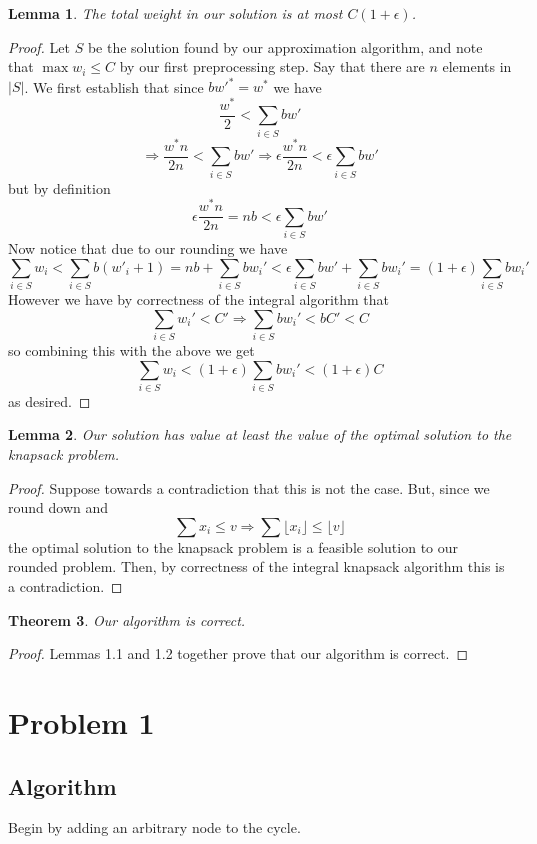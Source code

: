 \documentclass{article}
\newtheorem{theorem}{Theorem}[section]
\newtheorem{lemma}[theorem]{Lemma}
\begin{document}
\begin{lemma}
The total weight in our solution is at most $C (1 + \epsilon)$.
\end{lemma}
\begin{proof}
Let $S$ be the solution found by our approximation algorithm, and note that $\max{w_i} \leq C$ by our first preprocessing step. Say that there are $n$ elements in $|S|$. We first establish that since $bw'^*=w^*$ we have
\[\frac{w^*}{2} < \sum_{i\in S} b w' \]
\[\Rightarrow \frac{w^* n }{2n} < \sum_{i\in S}b w' \Rightarrow \epsilon  \frac{w^* n }{2n} <\epsilon \sum_{i\in S} b w'  \]
but by definition 
\[  \epsilon  \frac{w^* n }{2n} = nb < \epsilon \sum_{i\in S} b w'  \]
Now notice that due to our rounding we have
\[\sum_{i \in S}  w_i < \sum_{i \in S} b(w'_i + 1)= nb + \sum_{i \in S}b w_i' < \epsilon \sum_{i\in S} b w'   +  \sum_{i \in S}b w_i'  = (1+ \epsilon)  \sum_{i \in S}b w_i'  \]
However we have by correctness of the integral algorithm that 
\[\sum_{i \in S} w_i'< C' \Rightarrow \sum_{i \in S} b w_i'< bC' < C\]
so combining this with the above we get 
\[\sum_{i \in S}  w_i < (1+ \epsilon)  \sum_{i \in S}b w_i' <(1+ \epsilon) C \]
as desired.\end{proof}

\begin{lemma}
Our solution has value at least the value of the optimal solution to the knapsack problem.
\end{lemma}
\begin{proof}Suppose towards a contradiction that this is not the case. But, since we round down and 
\[\sum x_i \leq v \Rightarrow \sum \lfloor x_i \rfloor \leq \lfloor v \rfloor \]
the optimal solution to the knapsack problem is a feasible solution to our rounded problem. Then, by correctness of the integral knapsack algorithm this is a contradiction.
\end{proof}

\begin{theorem}
Our algorithm is correct.
\end{theorem}
\begin{proof}
Lemmas 1.1 and 1.2 together prove that our algorithm is correct.
\end{proof}



\section{Problem 1}

\subsection{Algorithm}
Begin by adding an arbitrary node to the cycle. 
\end{document}
